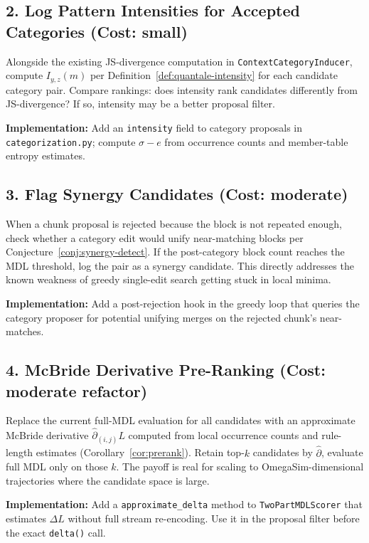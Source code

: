 \documentclass[11pt]{article}
\begin{document}
\subsection{2. Log Pattern Intensities for Accepted Categories (Cost: small)}

Alongside the existing JS-divergence computation in \texttt{ContextCategoryInducer}, compute $I_{y,z}(m)$ per Definition~\ref{def:quantale-intensity} for each candidate category pair. Compare rankings: does intensity rank candidates differently from JS-divergence? If so, intensity may be a better proposal filter.

\textbf{Implementation:} Add an \texttt{intensity} field to category proposals in \texttt{categorization.py}; compute $\sigma - e$ from occurrence counts and member-table entropy estimates.

\subsection{3. Flag Synergy Candidates (Cost: moderate)}

When a chunk proposal is rejected because the block is not repeated enough, check whether a category edit would unify near-matching blocks per Conjecture~\ref{conj:synergy-detect}. If the post-category block count reaches the MDL threshold, log the pair as a synergy candidate. This directly addresses the known weakness of greedy single-edit search getting stuck in local minima.

\textbf{Implementation:} Add a post-rejection hook in the greedy loop that queries the category proposer for potential unifying merges on the rejected chunk's near-matches.

\subsection{4. McBride Derivative Pre-Ranking (Cost: moderate refactor)}

Replace the current full-MDL evaluation for all candidates with an approximate McBride derivative $\widehat{\partial}_{(i,j)} L$ computed from local occurrence counts and rule-length estimates (Corollary~\ref{cor:prerank}). Retain top-$k$ candidates by $\widehat{\partial}$, evaluate full MDL only on those $k$. The payoff is real for scaling to OmegaSim-dimensional trajectories where the candidate space is large.

\textbf{Implementation:} Add a \texttt{approximate\_delta} method to \texttt{TwoPartMDLScorer} that estimates $\Delta L$ without full stream re-encoding. Use it in the proposal filter before the exact \texttt{delta()} call.
\end{document}
